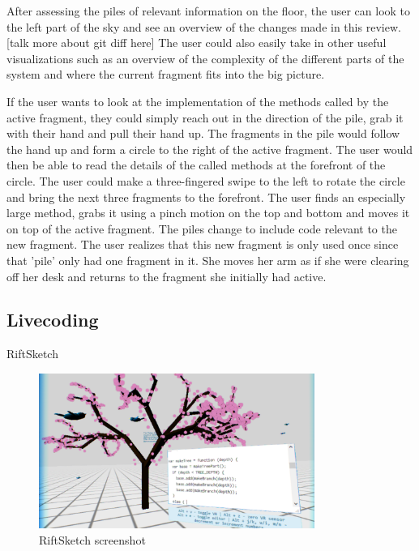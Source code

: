 \documentclass{acm_proc_article-sp}
\begin{document}
 After assessing the piles of relevant information on the floor, the user can look to the left part of the sky and see an overview of the changes made in this review. [talk more about git diff here]
 The user could also easily take in other useful visualizations such as an overview of the complexity of the different parts of the system and where the current fragment fits into the big picture.
    
    
 If the user wants to look at the implementation of the methods called by the active fragment, they could simply reach out in the direction of the pile, grab it with their hand and pull their hand up. The fragments in the pile would follow the hand up and form a circle to the right of the active fragment. The user would then be able to read the details of the called methods at the forefront of the circle. The user could make a three-fingered swipe to the left to rotate the circle and bring the next three fragments to the forefront.  The user finds an especially large method, grabs it using a pinch motion on the top and bottom and moves it on top of the active fragment. The piles change to include code relevant to the new fragment.  The user realizes that this new fragment is only used once since that 'pile' only had one  fragment in it. She moves her arm as if she were clearing off her desk and returns to the fragment she initially had active.
    
    


\subsection{Livecoding}
RiftSketch

\begin{figure}[ht!]
\centering
\includegraphics[width=90mm]{figures/riftsketch/closer}
\caption{RiftSketch screenshot \label{riftsketch}}
\end{figure}
\end{document}

